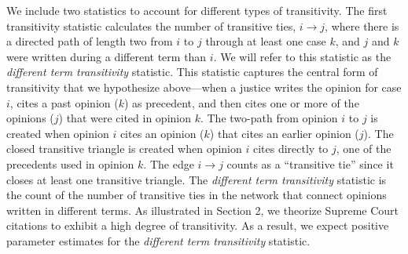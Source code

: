 \documentclass{cup-pan}
\begin{document}
We include two statistics to account for different types of transitivity. The first transitivity statistic calculates the number of transitive ties, $i \to j$, where there is a directed path of length two from $i$ to $j$ through at least one case $k$, and $j$ and $k$ were written during a different term than $i$. We will refer to this statistic as the \textit{different term transitivity} statistic. This statistic captures the central form of transitivity that we hypothesize above---when a justice writes the opinion for case $i$, cites a past opinion ($k$) as precedent, and then cites one or more of the opinions ($j$) that were cited in opinion $k$. The two-path from opinion $i$ to $j$ is created when opinion $i$ cites an opinion ($k$) that cites an earlier opinion ($j$). The closed transitive triangle is created when opinion $i$ cites directly to $j$, one of the precedents used in opinion $k$. The edge $i \to j$ counts as a ``transitive tie'' since it closes at least one transitive triangle. The \textit{different term transitivity}  statistic is the count of the number of transitive ties in the network that connect opinions written in different terms. As illustrated in Section 2, we theorize Supreme Court citations to exhibit a high degree of transitivity. As a result, we expect positive parameter estimates for the \textit{different term transitivity} statistic.
\end{document}
